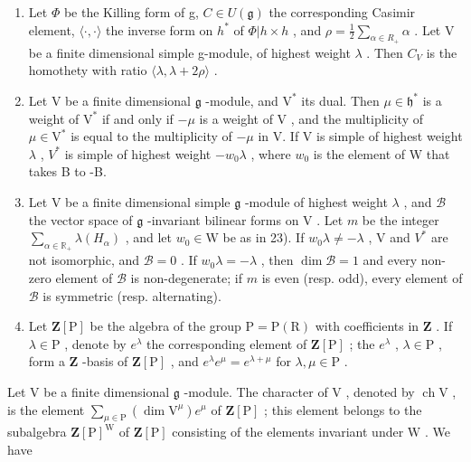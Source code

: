 \begin{enumerate}
\def\labelenumi{\arabic{enumi})}
\setcounter{enumi}{21}
\item
  Let \(\varPhi\) be the Killing form of g, \(C \in U(\mathfrak{g})\) the corresponding Casimir element, \(\langle\cdot,\cdot\rangle\) the inverse form on \(h^{*}\) of \(\varPhi|h \times h\) , and \(\rho = \frac{1}{2} \sum_{\alpha \in R_{+}} \alpha\) . Let V be a finite dimensional simple g-module, of highest weight \(\lambda\) . Then \(C_{V}\) is the homothety with ratio \(\langle\lambda, \lambda + 2\rho\rangle\) .
\item
  Let \(\mathrm{V}\) be a finite dimensional \(\mathfrak{g}\) -module, and \(\mathrm{V}^*\) its dual. Then \(\mu \in \mathfrak{h}^*\) is a weight of \(\mathrm{V}^*\) if and only if \(-\mu\) is a weight of \(\mathrm{V}\) , and the multiplicity of \(\mu \in \mathrm{V}^*\) is equal to the multiplicity of \(-\mu\) in V. If V is simple of highest weight \(\lambda\) , \(V^{*}\) is simple of highest weight \(-w_{0}\lambda\) , where \(w_{0}\) is the element of W that takes B to -B.
\item
  Let \(\mathrm{V}\) be a finite dimensional simple \(\mathfrak{g}\) -module of highest weight \(\lambda\) , and \(\mathcal{B}\) the vector space of \(\mathfrak{g}\) -invariant bilinear forms on \(\mathrm{V}\) . Let \(m\) be the integer \(\sum_{\alpha \in \mathbb{R}_+} \lambda(H_\alpha)\) , and let \(w_0 \in \mathrm{W}\) be as in 23). If \(w_0 \lambda \neq -\lambda\) , \(\mathrm{V}\) and \(V^*\) are not isomorphic, and \(\mathcal{B} = 0\) . If \(w_0 \lambda = -\lambda\) , then \(\dim \mathcal{B} = 1\) and every non-zero element of \(\mathcal{B}\) is non-degenerate; if \(m\) is even (resp. odd), every element of \(\mathcal{B}\) is symmetric (resp. alternating).
\item
  Let \(\mathbf{Z}[\mathrm{P}]\) be the algebra of the group \(\mathrm{P} = \mathrm{P}(\mathrm{R})\) with coefficients in \(\mathbf{Z}\) . If \(\lambda \in \mathrm{P}\) , denote by \(e^{\lambda}\) the corresponding element of \(\mathbf{Z}[\mathrm{P}]\) ; the \(e^{\lambda}\) , \(\lambda \in \mathrm{P}\) , form a \(\mathbf{Z}\) -basis of \(\mathbf{Z}[\mathrm{P}]\) , and \(e^{\lambda}e^{\mu} = e^{\lambda +\mu}\) for \(\lambda, \mu \in \mathrm{P}\) .
\end{enumerate}

Let \(\mathrm{V}\) be a finite dimensional \(\mathfrak{g}\) -module. The character of \(\mathrm{V}\) , denoted by \(\operatorname{ch} \mathrm{V}\) , is the element \(\sum_{\mu \in \mathrm{P}} (\dim \mathrm{V}^{\mu}) e^{\mu}\) of \(\mathbf{Z}[\mathrm{P}]\) ; this element belongs to the subalgebra \(\mathbf{Z}[\mathrm{P}]^{\mathrm{W}}\) of \(\mathbf{Z}[\mathrm{P}]\) consisting of the elements invariant under \(\mathrm{W}\) . We have

